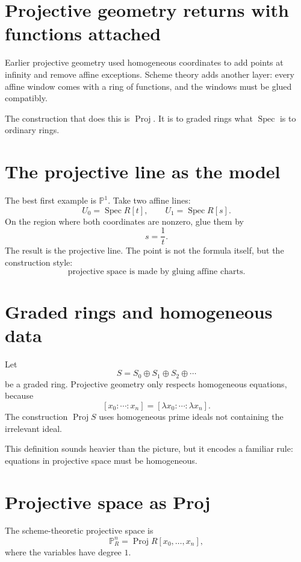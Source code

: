 
\section{Projective geometry returns with functions attached}

Earlier projective geometry used homogeneous coordinates to add points at infinity and remove affine exceptions. Scheme theory adds another layer: every affine window comes with a ring of functions, and the windows must be glued compatibly.

The construction that does this is \(\operatorname{Proj}\). It is to graded rings what \(\operatorname{Spec}\) is to ordinary rings.

\section{The projective line as the model}

The best first example is \(\mathbb P^1\). Take two affine lines:
\[
  U_0=\operatorname{Spec}R[t],
  \qquad
  U_1=\operatorname{Spec}R[s].
\]
On the region where both coordinates are nonzero, glue them by
\[
  s=\frac1t.
\]
The result is the projective line. The point is not the formula itself, but the construction style:
\[
  \text{projective space is made by gluing affine charts.}
\]

\section{Graded rings and homogeneous data}

Let
\[
  S=S_0\oplus S_1\oplus S_2\oplus\cdots
\]
be a graded ring. Projective geometry only respects homogeneous equations, because
\[
  [x_0:\cdots:x_n]=[\lambda x_0:\cdots:\lambda x_n].
\]
The construction \(\operatorname{Proj}S\) uses homogeneous prime ideals not containing the irrelevant ideal.

This definition sounds heavier than the picture, but it encodes a familiar rule: equations in projective space must be homogeneous.

\section{Projective space as Proj}

The scheme-theoretic projective space is
\[
  \mathbb P^n_R=\operatorname{Proj}R[x_0,\ldots,x_n],
\]
where the variables have degree \(1\).

